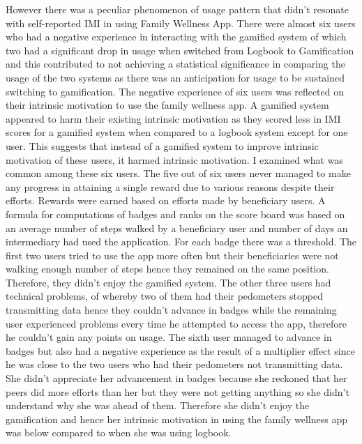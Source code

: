 However there was a peculiar phenomenon of usage pattern that didn't resonate with self-reported IMI in using Family Wellness App. There were almost six users who had a negative experience in interacting with the gamified system of which two had a significant drop in usage when switched from Logbook to Gamification and this contributed to not achieving a statistical significance in comparing the usage of the two systems as there was an anticipation for usage to be sustained switching to gamification. The negative experience of six users was reflected on their intrinsic motivation to use the family wellness app. A gamified system appeared to harm their existing intrinsic motivation as they scored less in IMI scores for a gamified system when compared to a logbook system except for one user. This suggests that instead of a gamified system to improve intrinsic motivation of these users, it harmed intrinsic motivation. I examined what was common among these six users. The five out of six users never managed to make any progress in attaining a single reward due to various reasons despite their efforts. Rewards were earned based on efforts made by beneficiary users. A formula for computations of badges and ranks on the score board was based on an average number of steps walked by a beneficiary user and number of days an intermediary had used the application. For each badge there was a threshold. The first two users tried to use the app more often but their beneficiaries were not walking enough number of steps hence they remained on the same position. Therefore, they didn't enjoy the gamified system. The other three users had technical problems, of whereby two of them had their pedometers stopped transmitting data hence they couldn't advance in badges while the remaining user experienced problems every time he attempted to access the app, therefore he couldn't gain any points on usage. The sixth user managed to advance in badges but also had a negative experience as the result of a multiplier effect since he was close to the two users who had their pedometers not transmitting data. She didn't appreciate her advancement in badges because she reckoned that her peers did more efforts than her but they were not getting anything so she didn't understand why she was ahead of them. Therefore she didn't enjoy the gamification and hence her intrinsic motivation in using the family wellness app was below compared to when she was using logbook. 

